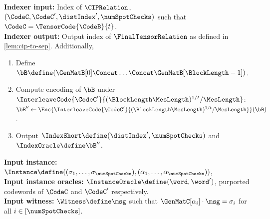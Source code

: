     \begin{tcolorbox}[breakable, enhanced, colback=white, boxrule=0.65pt]
        \textbf{Indexer input: } Index of $\CIPRelation$, $(\CodeC, \CodeC', \distIndex', \numSpotChecks)$ such that $\CodeC = \TensorCode{\CodeB}{t}$.\\
        \textbf{Indexer output: } Output index of $\FinalTensorRelation$ as defined in \cref{lem:cip-to-sep}.
        Additionally, 
        \begin{enumerate}[nolistsep]
            \item Define $\bB \define (\GenMatB[0] \Concat \dotsc \Concat \GenMatB[\BlockLength-1])$.
            \item Compute encoding of $\bB$ under $\InterleaveCode{\CodeC'}{(\BlockLength\MesLength)^{1/t}/\MesLength}$: $\bB'' \gets \Enc{\InterleaveCode{\CodeC'}{(\BlockLength\MesLength)^{1/t}/\MesLength}}(\bB)$.
            \item Output $\IndexShort \define (\distIndex', \numSpotChecks)$ and $\IndexOracle \define \bB''$.
        \end{enumerate}
    \end{tcolorbox}
    \vspace{-13.72pt}
    \begin{tcolorbox}[breakable, enhanced, colback=white, boxrule=0.65pt]
        \textbf{Input instance: } $\Instance \define ((\sigma_1, \dotsc, \sigma_{\numSpotChecks}), (\alpha_1, \dotsc, \alpha_{\numSpotChecks}))$, \\
        \textbf{Input instance oracles: } $\InstanceOracle \define (\word, \word')$, purported codewords of $\CodeC$ and $\CodeC'$ respectively.\\
        \textbf{Input witness: } $\Witness \define \msg$ such that $\GenMatC[\alpha_i] \cdot \msg = \sigma_i$ for all $i \in [\numSpotChecks]$.
    \end{tcolorbox}
    \vspace{-13.72pt}

